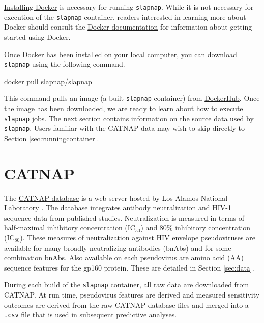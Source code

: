 \documentclass[
]{article}
\newenvironment{Shaded}{\begin{snugshade}}{\end{snugshade}}
\newcommand{\ExtensionTok}[1]{#1}
\newcommand{\NormalTok}[1]{#1}
\begin{document}
\href{https://docs.docker.com/docker-for-windows/install/}{Installing Docker} is necessary for running \texttt{slapnap}. While it is not necessary for execution of the \texttt{slapnap} container, readers interested in learning more about Docker should consult the \href{https://docs.docker.com/get-started/}{Docker documentation} for information about getting started using Docker.

Once Docker has been installed on your local computer, you can download \texttt{slapnap} using the following command.

\begin{Shaded}
\begin{Highlighting}[]
\ExtensionTok{docker}\NormalTok{ pull slapnap/slapnap}
\end{Highlighting}
\end{Shaded}

This command pulls an image (a built \texttt{slapnap} container) from \href{https://hub.docker.com/}{DockerHub}. Once the image has been downloaded, we are ready to learn about how to execute \texttt{slapnap} jobs. The next section contains information on the source data used by \texttt{slapnap}. Users familiar with the CATNAP data may wish to skip directly to Section \ref{sec:runningcontainer}.

\hypertarget{sec:catnap}{%
\section{CATNAP}\label{sec:catnap}}

The \href{https://www.hiv.lanl.gov/components/sequence/HIV/neutralization/index.html}{CATNAP database} is a web server hosted by Los Alamos National Laboratory \citep{yoon2015catnap}. The database integrates antibody neutralization and HIV-1 sequence data from published studies. Neutralization is measured in terms of half-maximal inhibitory concentration (IC\(_{50}\)) and 80\% inhibitory concentration (IC\(_{80}\)). These measures of neutralization against HIV envelope pseudoviruses are available for many broadly neutralizing antibodies (bnAbs) and for some combination bnAbs. Also available on each pseudovirus are amino acid (AA) sequence features for the gp160 protein. These are detailed in Section \ref{sec:data}.

During each build of the \texttt{slapnap} container, all raw data are downloaded from CATNAP. At run time, pseudovirus features are derived and measured sensitivity outcomes are derived from the raw CATNAP database files and merged into a \texttt{.csv} file that is used in subsequent predictive analyses.
\end{document}
